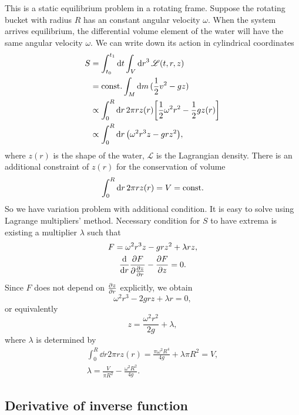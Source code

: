 \documentclass[10pt]{article}
\begin{document}
	This is a static equilibrium problem in a rotating frame. Suppose the rotating bucket with radius $R$ has an constant angular velocity $\omega$. When the system arrives equilibrium, the differential volume element of the water will have the same angular velocity $\omega$. We can write down its action in cylindrical coordinates
	\begin{align*}
		S &= \int_{t_0}^{t_1} \dd{t} \int_{V} \dd{r}^3 \mathscr{L}(t, r, z) \\
		&= {\mathrm{const.}} \int_M \dd{m} (\frac{1}{2} v^2 - g z) \\
		&\propto \int_{0}^{R} \dd{r} 2 \pi r z(r) \qty[\frac{1}{2} \omega^2 r^2 - \frac{1}{2} g z(r)] \\
		&\propto \int_{0}^{R} \dd{r} \qty(\omega^2 r^3 z - g r z^2),
	\end{align*}
	where $z(r)$ is the shape of the water, $\mathscr{L}$ is the Lagrangian density. There is an additional constraint of $z(r)$ for the conservation of volume
	\begin{equation}
		\int_0^R \dd{r} 2 \pi r z(r) = V = {\mathrm{const.}}
	\end{equation}
	So we have variation problem with additional condition. It is easy to solve using Lagrange multipliers' method. Necessary condition for $S$ to have extrema is existing a multiplier $\lambda$ such that
	\begin{gather}
		F = \omega^2 r^3 z - g r z^2 + \lambda r z, \\
		\dv{r} \pdv{F}{\pdv{z}{r}} - \pdv{F}{z} = 0.
	\end{gather}
	Since $F$ does not depend on $\pdv{z}{r}$ explicitly, we obtain
	\begin{equation}
		\omega^2 r^3 - 2 g r z + \lambda r = 0,
	\end{equation}
	or equivalently
	\begin{equation}
		z = \frac{\omega^2 r^2}{2g} + \lambda,
	\end{equation}
	where $\lambda$ is determined by
	\begin{gather*}
		\int_0^R \dd{r} 2 \pi r z(r) = \frac{\pi \omega^2 R^4}{4g} + \lambda \pi R^2 = V, \\
		\lambda = \frac{V}{\pi R^2} - \frac{\omega^2 R^2}{4 g}.
	\end{gather*}

\subsection{Derivative of inverse function}
\end{document}
